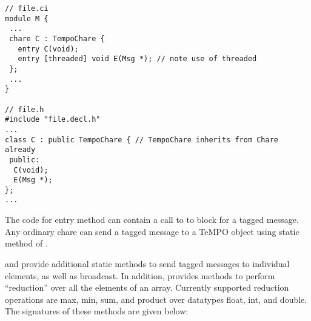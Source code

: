 \begin{verbatim}
// file.ci
module M {
 ...
 chare C : TempoChare {
   entry C(void);
   entry [threaded] void E(Msg *); // note use of threaded
 };
 ...
}

// file.h
#include "file.decl.h"
...
class C : public TempoChare { // TempoChare inherits from Chare already
 public:
  C(void);
  E(Msg *);
};
...
\end{verbatim}

The code for entry method  can contain a call to 
to block for a tagged message. Any ordinary chare can send a tagged
message to a TeMPO object using  static method of 
.

 and  provide additional static methods to
send tagged messages to individual elements, as well as broadcast. In
addition,  provides methods to perform ``reduction''
over all the elements of an array. Currently supported reduction operations
are max, min, sum, and product over datatypes float, int, and double.
The signatures of these methods are given below:

